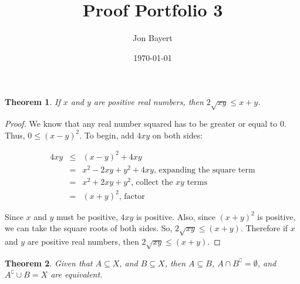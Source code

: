 \documentclass{article}
\title{Proof Portfolio 3}
\author{Jon Bayert}
\date{\today}
\newtheorem{theorem}{Theorem}
\begin{document}
\maketitle
\begin{theorem}
  If $x$ and $y$ are positive real numbers, then $2\sqrt{xy}\leq x+y$.
\end{theorem}
    
\begin{proof}
    We know that any real number squared has to be greater or equal to 0. Thus, $0 \leq (x-y)^2 $. To begin, add $4xy$ on both sides:
    
    \begin{eqnarray*}
    4xy &\leq& (x-y)^2 +4xy\\
     &=& x^2 - 2xy +y^2 +4xy\text{, expanding the square term}\\
     &=&  x^2 + 2xy +y^2\text{, collect the $xy$ terms}\\
     &=&  (x + y)^2\text{, factor}
    \end{eqnarray*}

    Since $x$ and $y$ must be positive, $4xy$ is positive. Also, since $(x+y)^2$ is positive, we can take the square roots of both sides. So, $ 2\sqrt{xy} \leq (x+y)$. Therefore if $x$ and $y$ are positive real numbers, then   $ 2\sqrt{xy} \leq (x+y)$.
    
\end{proof}
\pagebreak

\begin{theorem}
      Given that $A \subseteq X$, and $B \subseteq X$, then $A \subseteq B$, $A \cap B^\complement = \emptyset$, and $A^\complement \cup B = X$ are equivalent.
\end{theorem}
\end{document}
